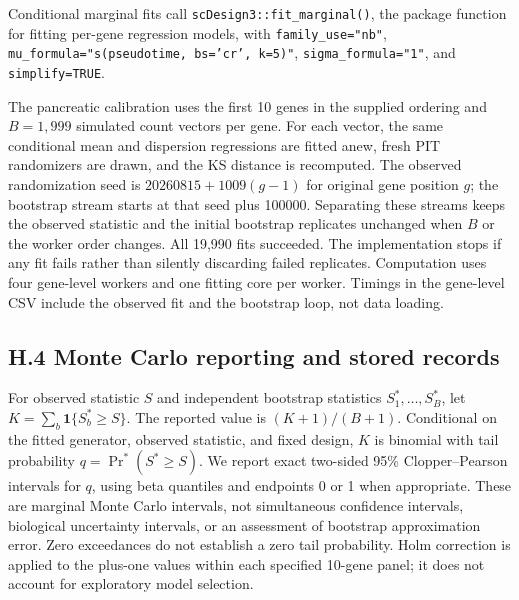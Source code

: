 \documentclass[12pt]{article}
\theoremstyle{remark}
\begin{document}
Conditional marginal fits call \texttt{scDesign3::fit\_marginal()}, the
package function for fitting per-gene regression models, with
\texttt{family\_use="nb"}, \texttt{mu\_formula="s(pseudotime, bs='cr', k=5)"},
\texttt{sigma\_formula="1"}, and \texttt{simplify=TRUE}.

The pancreatic calibration uses the first 10 genes in the supplied ordering
and $B=1,999$ simulated count vectors per gene. For each vector, the same
conditional mean and dispersion regressions are fitted anew, fresh PIT
randomizers are drawn, and the KS distance is recomputed. The observed
randomization seed is $20260815+1009(g-1)$ for original gene position $g$;
the bootstrap stream starts at that seed plus 100000. Separating these
streams keeps the observed statistic and the initial bootstrap replicates
unchanged when $B$ or the worker order changes. All 19,990 fits succeeded.
The implementation stops if any fit fails rather than silently discarding
failed replicates. Computation uses four gene-level workers and one fitting
core per worker. Timings in the gene-level CSV include the observed fit and
the bootstrap loop, not data loading.

\subsection*{H.4 Monte Carlo reporting and stored records}

For observed statistic $S$ and independent bootstrap statistics
$S_1^*,\ldots,S_B^*$, let $K=\sum_b\mathbf{1}\{S_b^*\ge S\}$.
The reported value is $(K+1)/(B+1)$. Conditional on the fitted generator,
observed statistic, and fixed design, $K$ is binomial with tail probability
$q=\Pr^*(S^*\ge S)$. We report exact two-sided 95\% Clopper--Pearson
intervals for $q$, using beta quantiles and endpoints 0 or 1 when appropriate.
These are marginal Monte Carlo intervals, not simultaneous confidence
intervals, biological uncertainty intervals, or an assessment of bootstrap
approximation error. Zero exceedances do not establish a zero tail
probability. Holm correction is applied to the plus-one values within each
specified 10-gene panel; it does not account for exploratory model selection.
\end{document}
